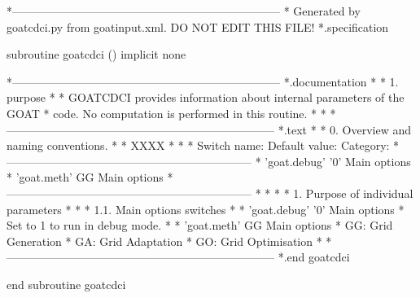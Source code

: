 *-----------------------------------------------------------------------
* Generated by goatcdci.py from goatinput.xml. DO NOT EDIT THIS FILE!
*.specification

      subroutine goatcdci ()
      implicit none

*-----------------------------------------------------------------------
*.documentation
*
*  1. purpose
*
*    GOATCDCI provides information about internal parameters of the GOAT
*    code. No computation is performed in this routine.
*
*
*-----------------------------------------------------------------------
*.text
*
*  0. Overview and naming conventions.
*
*    XXXX
*
*
*    Switch name:               Default value:         Category:
*  -----------------------------------------------------------------
*    'goat.debug'               '0'                    Main options
*    'goat.meth'                GG                     Main options
*  -----------------------------------------------------------------
*
*
*
*  1. Purpose of individual parameters
*
*   *   1.1. Main options switches
*
*    'goat.debug'               '0'                    Main options
*    Set to 1 to run in debug mode.
*
*    'goat.meth'                GG                     Main options
*    GG: Grid Generation
*    GA: Grid Adaptation
*    GO: Grid Optimisation
*
*-----------------------------------------------------------------------
*.end goatcdci

      end subroutine goatcdci

